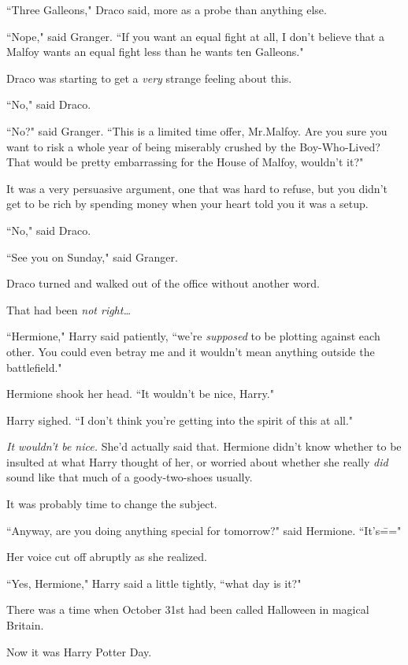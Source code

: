 ``Three Galleons," Draco said, more as a probe than anything else.

``Nope," said Granger. ``If you want an equal fight at all, I don't believe that a Malfoy wants an equal fight less than he wants ten Galleons."

Draco was starting to get a \emph{very} strange feeling about this.

``No," said Draco.

``No?" said Granger. ``This is a limited time offer, Mr.\?Malfoy. Are you sure you want to risk a whole year of being miserably crushed by the Boy-Who-Lived? That would be pretty embarrassing for the House of Malfoy, wouldn't it?"

It was a very persuasive argument, one that was hard to refuse, but you didn't get to be rich by spending money when your heart told you it was a setup.

``No," said Draco.

``See you on Sunday," said Granger.

Draco turned and walked out of the office without another word.

That had been \emph{not right{\ldots}}

\later

``Hermione," Harry said patiently, ``we're \emph{supposed} to be plotting against each other. You could even betray me and it wouldn't mean anything outside the battlefield."

Hermione shook her head. ``It wouldn't be nice, Harry."

Harry sighed. ``I don't think you're getting into the spirit of this at all."

\emph{It wouldn't be nice.} She'd actually said that. Hermione didn't know whether to be insulted at what Harry thought of her, or worried about whether she really \emph{did} sound like that much of a goody-two-shoes usually.

It was probably time to change the subject.

``Anyway, are you doing anything special for tomorrow?" said Hermione. ``It's\==="

Her voice cut off abruptly as she realized.

``Yes, Hermione," Harry said a little tightly, ``what day is it?"


There was a time when October 31st had been called Halloween in magical Britain.

Now it was Harry Potter Day.

